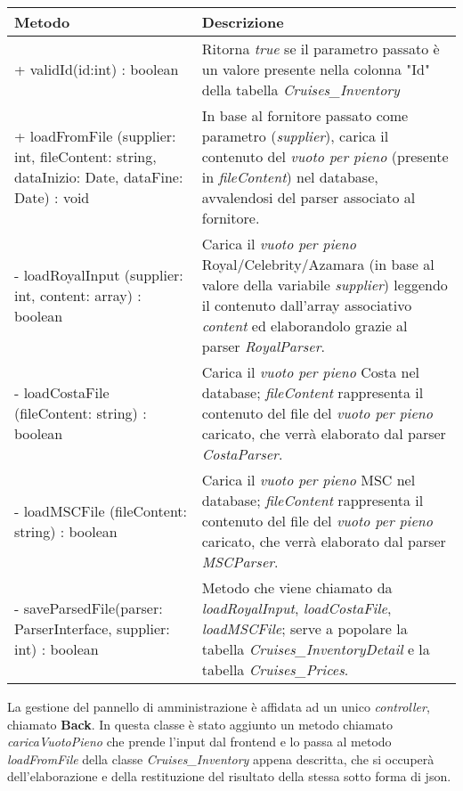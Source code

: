 \begin{center}
	\def\arraystretch{1.5}
	\begin{longtable}{ >{\raggedright}p{5.5cm} p{6.8cm}} 
		\hline
		\textbf{Metodo} & \textbf{Descrizione} \\ \hline
		+ validId(id:int) : boolean & Ritorna \textit{true} se il parametro passato è un valore presente nella colonna "Id" della tabella \textit{Cruises\_Inventory}\\
		\hline
		+ loadFromFile (supplier: int, fileContent: string, dataInizio: Date, dataFine: Date) : void & In base al fornitore passato come parametro (\textit{supplier}), carica il contenuto del \textit{vuoto per pieno} (presente in \textit{fileContent}) nel database, avvalendosi del parser associato al fornitore.\\
		\hline
		- loadRoyalInput (supplier: int, content: array) : boolean & Carica il \textit{vuoto per pieno} Royal/Celebrity/Azamara (in base al valore della variabile \textit{supplier}) leggendo il contenuto dall'array associativo \textit{content} ed elaborandolo grazie al parser \textit{RoyalParser}.\\
		\hline
		- loadCostaFile (fileContent: string) : boolean & Carica il \textit{vuoto per pieno} Costa nel database; \textit{fileContent} rappresenta il contenuto del file del \textit{vuoto per pieno} caricato, che verrà elaborato dal parser \textit{CostaParser}.\\
		\hline
		- loadMSCFile (fileContent: string) : boolean & Carica il \textit{vuoto per pieno} MSC nel database; \textit{fileContent} rappresenta il contenuto del file del \textit{vuoto per pieno} caricato, che verrà elaborato dal parser \textit{MSCParser}.\\
		\hline
		- saveParsedFile(parser: ParserInterface, supplier: int) : boolean & Metodo che viene chiamato da \textit{loadRoyalInput}, \textit{loadCostaFile}, \textit{loadMSCFile}; serve a popolare la tabella \textit{Cruises\_InventoryDetail} e la tabella \textit{Cruises\_Prices}.\\
		\hline
	\end{longtable}
\end{center}
La gestione del pannello di amministrazione è affidata ad un unico \textit{controller}, chiamato \textbf{Back}. In questa classe è stato aggiunto un metodo chiamato \textit{caricaVuotoPieno} che prende l'input dal frontend e lo passa al metodo \textit{loadFromFile} della classe \textit{Cruises\_Inventory} appena descritta, che si occuperà dell'elaborazione e della restituzione del risultato della stessa sotto forma di \gls{json}.

